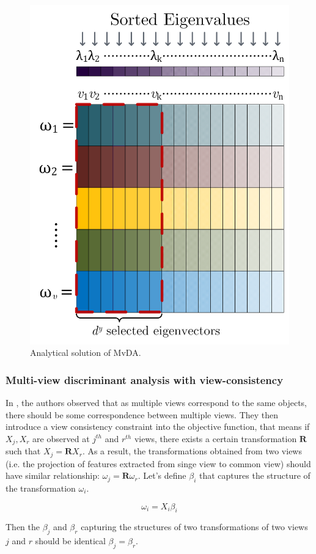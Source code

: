         \begin{figure}[htbp]
            \centering
            \includegraphics[width=0.4\linewidth]{figs/mvda_solution.png}
            \caption{Analytical solution of MvDA.}
            \label{fig:mvda_solution}
        \end{figure}

    \subsubsection{Multi-view discriminant analysis with view-consistency} \label{subsubsec:mvdavc}

        In \cite{kan2016multi}, the authors observed that as multiple views correspond to the same objects, there should be some correspondence between multiple views.
        They then introduce a view consistency constraint into the objective function, that means if $X_j, X_r$ are observed at $j^{th}$ and $r^{th}$ views, there exists a certain transformation $\boldsymbol{R}$ such that $X_j = \boldsymbol{R}X_r$.
        As a result, the transformations obtained from two views (i.e. the projection of features extracted from singe view to common view) should have similar relationship: ${\omega}_j = \boldsymbol{R}{\omega}_r$.
        Let's define $\beta_i$ that captures the structure of the transformation ${\omega}_i$.

        \begin{equation}
            \omega_i = X_i\beta_i
            \label{eq:MvDA-vc_beta}
        \end{equation}

        Then the $\beta_j$ and $\beta_r$ capturing the structures of two transformations of two views $j$ and $r$ should be identical ${\beta}_j = {\beta}_r$.

